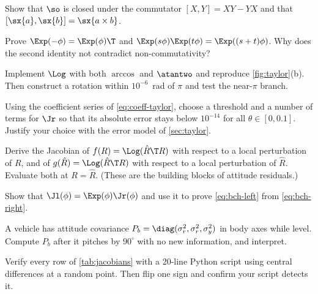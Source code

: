 \begin{exercises}
  \item Show that $\so$ is closed under the commutator $[X, Y] = XY - YX$ and that
        $[\sx{a}, \sx{b}] = \sx{a\times b}$.
  \item Prove $\Exp(-\phi) = \Exp(\phi)\T$ and $\Exp(s\phi)\Exp(t\phi) = \Exp((s+t)\phi)$. Why does the second
        identity not contradict non-commutativity?
  \item Implement $\Log$ with both $\arccos$ and $\atantwo$ and reproduce \cref{fig:taylor}(b).
        Then construct a rotation within $10^{-6}$~rad of $\pi$ and test the near-$\pi$ branch.
  \item Using the coefficient series of \eqref{eq:coeff-taylor}, choose a threshold and a number of terms
        for $\Jr$ so that its absolute error stays below $10^{-14}$ for all $\theta \in [0, 0.1]$. Justify
        your choice with the error model of \cref{sec:taylor}.
  \item Derive the Jacobian of $f(R) = \Log(\hat R\T R)$ with respect to a local perturbation of $R$, and of
        $g(\hat R) = \Log(\hat R\T R)$ with respect to a local perturbation of $\hat R$. Evaluate both at
        $R = \hat R$. (These are the building blocks of attitude residuals.)
  \item Show that $\Jl(\phi) = \Exp(\phi)\Jr(\phi)$ and use it to prove \eqref{eq:bch-left} from
        \eqref{eq:bch-right}.
  \item A vehicle has attitude covariance $P_b = \diag(\sigma_r^2, \sigma_r^2, \sigma_y^2)$ in body axes while
        level. Compute $P_b$ after it pitches by $90^\circ$ with no new information, and interpret.
  \item Verify every row of \cref{tab:jacobians} with a 20-line Python script using central differences at
        a random point. Then flip one sign and confirm your script detects it.
\end{exercises}
